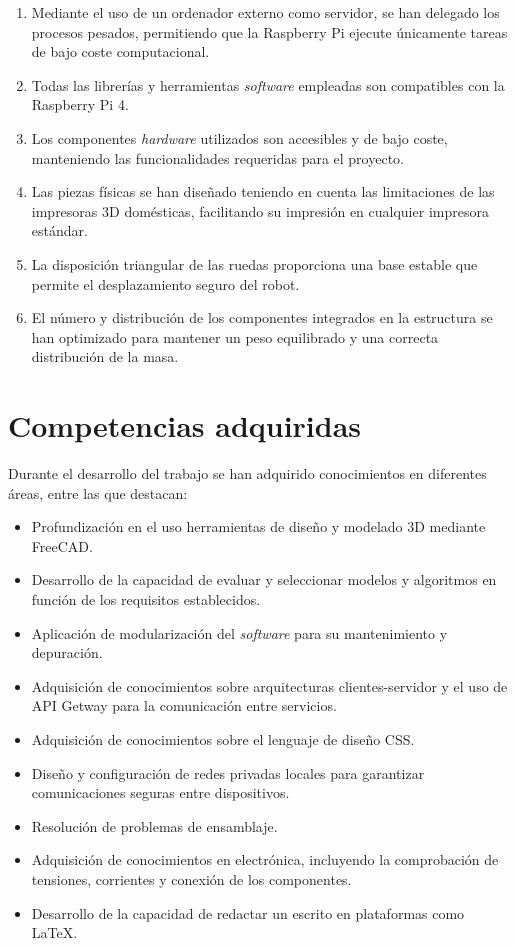 \begin{enumerate}
	\item Mediante el uso de un ordenador externo como servidor, se han delegado los procesos pesados, permitiendo que la Raspberry Pi ejecute únicamente tareas de bajo coste computacional.
	\item Todas las librerías y herramientas \textit{software} empleadas son compatibles con la Raspberry Pi 4.
	\item Los componentes \textit{hardware} utilizados son accesibles y de bajo coste, manteniendo las funcionalidades requeridas para el proyecto.
	\item Las piezas físicas se han diseñado teniendo en cuenta las limitaciones de las impresoras 3D domésticas, facilitando su impresión en cualquier impresora estándar.
	\item La disposición triangular de las ruedas proporciona una base estable que permite el desplazamiento seguro del robot.
	\item El número y distribución de los componentes integrados en la estructura se han optimizado para mantener un peso equilibrado y una correcta distribución de la masa.
\end{enumerate}


\section{Competencias adquiridas}

Durante el desarrollo del trabajo se han adquirido conocimientos en diferentes áreas, entre las que destacan:

\begin{itemize}
	\item Profundización en el uso herramientas de diseño y modelado 3D mediante FreeCAD.
	\item Desarrollo de la capacidad de evaluar y seleccionar modelos y algoritmos en función de los requisitos establecidos.
	\item Aplicación de modularización del \textit{software} para su mantenimiento y depuración.
    \item Adquisición de conocimientos sobre arquitecturas clientes-servidor y el uso de API Getway para la comunicación entre servicios.
	\item Adquisición de conocimientos sobre el lenguaje de diseño CSS.
	\item Diseño y configuración de redes privadas locales para garantizar comunicaciones seguras entre dispositivos.
	\item Resolución de problemas de ensamblaje.
	\item Adquisición de conocimientos en electrónica, incluyendo la comprobación de tensiones, corrientes y conexión de  los componentes.
    \item Desarrollo de la capacidad de redactar un escrito en plataformas como \LaTeX.
\end{itemize}


